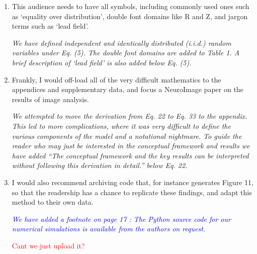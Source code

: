 \documentclass{article}
\newcommand{\dean}[1]{\textcolor{red}{#1}}
\newcommand{\parham}[1]{\textcolor{blue}{#1}}
\begin{document}
\begin{enumerate}
		\item This audience needs to have all symbols, including commonly used ones such as `equality over distribution', double font domains like R and Z, and jargon terms such as `lead field'.
			
		\emph{We have defined independent and identically distributed (i.i.d.) random variables under Eq. (5). The double font domains are added to Table 1. A brief description of `lead field' is also added below Eq. (5).}  
			
		\item Frankly, I would off-load all of the very difficult mathematics to the appendices and supplementary data, and focus a NeuroImage paper on the results of image analysis. 
			
			\emph{We attempted to move the derivation from Eq. 22 to Eq. 33 to the appendix. This led to more complications, where it was very difficult to define the various components of the model and a notational nightmare. To guide the reader who may just be interested in the conceptual framework and results we have added ``The conceptual framework and the key results can be interpreted without following this derivation in detail.'' below Eq. 22.}
			
						
			
			\item I would also recommend archiving code that, for instance generates Figure 11, so that the readership has a chance to replicate these findings, and adapt this method to their own data.
			
 			\emph{\parham{We have added a footnote on page 17 : The Python source code for our numerical simulations is available from the authors on request.}}
 		
\dean{Cant we just upload it?}
			                                       
			\end{enumerate}  
\end{document}
